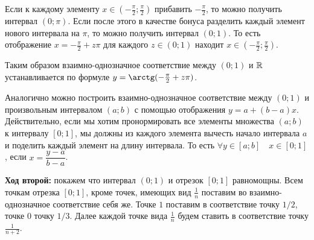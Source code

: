 \documentclass[12pt, a4paper]{article}
\begin{document}
\begin{itemize}
Если к каждому элементу $x \in (-\frac{\pi}{2};\frac{\pi}{2})$  прибавить $-\frac{\pi}{2}$, то можно получить интервал $(0;\pi)$. Если после этого в качестве бонуса разделить каждый элемент нового интервала на $\pi$, то можно получить интервал $(0;1)$. То есть отображение $x = - \frac{\pi}{2} + z \pi$ для каждого $z \in (0;1)$ находит $x \in (-\frac{\pi}{2};\frac{\pi}{2})$.

Таким образом взаимно-однозначное соответствие между $(0;1)$ и $\mathbb R$ устанавливается по формуле $y = \arctg(- \frac{\pi}{2} + z \pi)$.

Аналогично можно построить взаимно-однозначное соответствие между $(0;1)$ и  произвольным интервалом $(a;b)$ с помощью отображения $y = a+(b-a)x$. Действительно, если мы хотим пронормировать все элементы множества $(a;b)$ к интервалу $[0;1]$, мы должны из каждого элемента вычесть начало интервала $a$ и поделить каждый элемент на длину интервала. То есть $\forall y \in [a;b] \quad x \in [0;1]$, если $x = \dfrac{y-a}{b-a}$.

\textbf{Ход второй:} покажем что интервал $(0;1)$ и отрезок $[0;1]$ равномощны. Всем точкам отрезка $[0;1]$, кроме точек, имеющих вид $\frac{1}{n}$ поставим во взаимно-однозначное соответствие себя же. Точке $1$ поставим в соответствие точку $1/2$, точке $0$ точку $1/3$. Далее каждой точке вида $\frac{1}{n}$  будем ставить в соответствие точку $\frac{1}{n+2}$.


\end{itemize}
\end{document}
